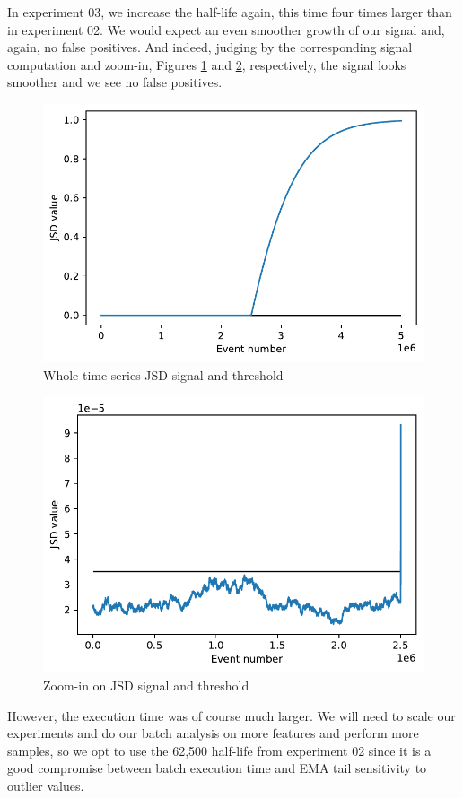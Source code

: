 \documentclass[sigconf]{acmart}
\begin{document}
In experiment 03, we increase the half-life again, this time four times larger than in experiment 02. We would expect an even smoother growth of our signal and, again, no false positives. And indeed, judging by the corresponding signal computation and zoom-in, Figures \ref{fig:JSD-signal-03} and \ref{fig:JSD-signal-zoom-03}, respectively, the signal looks smoother and we see no false positives.
\begin{figure}[!htb]
    \begin{center}
      \includegraphics[scale=0.5]{figures/stream-analysis-viz-250000.pdf}
      \caption{Whole time-series JSD signal and threshold}
      \label{fig:JSD-signal-03}
    \end{center}
\end{figure}
\begin{figure}[!htb]
    \begin{center}
      \includegraphics[scale=0.5]{figures/stream-analysis-viz-zoom-250000.pdf}
      \caption{Zoom-in on JSD signal and threshold}
     \label{fig:JSD-signal-zoom-03}
    \end{center}
\end{figure}
However, the execution time was of course much larger. We will need to scale our experiments and do our batch analysis on more features and perform more samples, so we opt to use the 62,500 half-life from experiment 02 since it is a good compromise between batch execution time and EMA tail sensitivity to outlier values.
\end{document}
